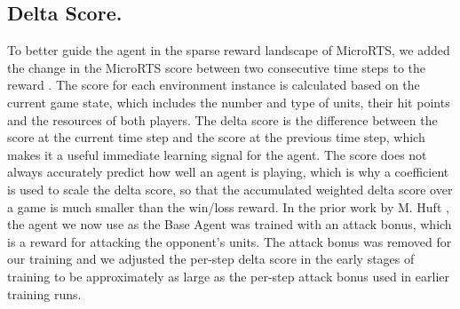 \documentclass[10pt,twocolumn,letterpaper]{article}
\begin{document}
\subsection{Delta Score.}
To better guide the agent in the sparse reward landscape of MicroRTS, we added the change in the MicroRTS score between two consecutive time steps to the reward \cite{huang2021gym, Ontanon2013CombinatorialBandit}.
The score for each environment instance is calculated based on the current game state, which includes the number and type of units, their hit points and the resources of both players.
The delta score is the difference between the score at the current time step and the score at the previous time step, which makes it a useful immediate learning signal for the agent.
The score does not always accurately predict how well an agent is playing, which is why a coefficient is used to scale the delta score, so that the accumulated weighted delta score over a game is much smaller than the win/loss reward.
In the prior work by M. Huft \cite{huft2023microrts}, the agent we now use as the Base Agent was trained with an attack bonus, which is a reward for attacking the opponent’s units.
The attack bonus was removed for our training and we adjusted the per-step delta score in the early stages of training to be approximately as large as the per-step attack bonus used in earlier training runs.
\end{document}
